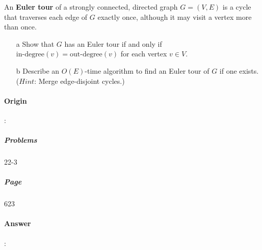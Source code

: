 \documentclass{article}
\begin{document}
An \textbf{Euler tour} of a strongly connected, directed graph $G = (V, E)$ is a cycle that traverses each edge of $G$ exactly once, although it may visit a vertex more than once.

\begin{enumerate}
  \item[a] Show that $G$ has an Euler tour if and only if $\text{in-degree}(v) = \text{out-degree}(v)$ for each vertex $v \in V$.
  \item[b] Describe an $O(E)$-time algorithm to find an Euler tour of $G$ if one exists. ($\textit{Hint:}$ Merge edge-disjoint cycles.)
\end{enumerate}

\paragraph{Origin}:
  \subparagraph{Problems}22-3
  \subparagraph{Page}623
\paragraph{Answer}:
\end{document}
